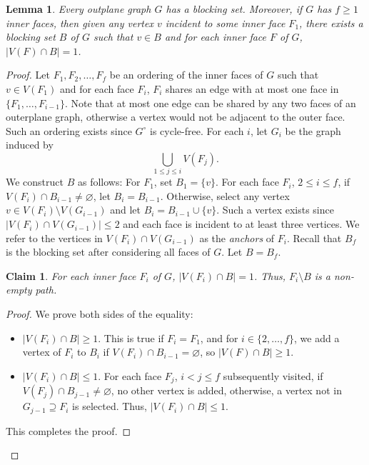 \documentclass{patmorin}
\let\emptyset\varnothing
\newcommand{\wdual}[1]{#1^{\circ}}
\newtheorem{lemma}[theorem]{Lemma}
\newtheorem{claim}{Claim}[theorem]
\begin{document}
\begin{lemma}
 Every outplane graph $G$ has a blocking set. Moreover, if $G$ has
 $f\ge 1$ inner faces, 
 then given any vertex $v$ incident to some inner face $F_1$, there exists a blocking set $B$ of $G$ such that $v \in B$ and for each inner face $F$ of $G$, $|V(F) \cap B|=1$.
 \label{lem:blocking_out}
\end{lemma}
\begin{proof}
 Let $F_1,F_2,\ldots,F_{f}$ be an ordering of the inner faces of $G$ such that $v \in V(F_1)$ and for each face $F_i$, $F_i$ shares an edge with at most one face in $\{F_1,\ldots,F_{i-1}\}$. Note that at most one edge can be shared by any two faces of an outerplane graph, otherwise a vertex would not be adjacent to the outer face. 
 Such an ordering exists since $\wdual{G}$ is cycle-free. For each $i$, let $G_i$ be the graph induced by
 \begin{equation}
  \bigcup_{1 \leq j \leq i}V(F_j).
 \end{equation}
 We construct $B$ as follows: For $F_1$, set $B_1=\{v\}$. For each face $F_i$, $2 \leq i \leq f$, if $V(F_i) \cap B_{i-1} \not= \emptyset$, let $B_i = B_{i-1}$. Otherwise, select any vertex $v \in V(F_i) \setminus V(G_{i-1})$ and let $B_i = B_{i-1} \cup \{v\}$. Such a vertex exists since $|V(F_i) \cap V(G_{i-1})|\leq2$ and each face is incident to at least three vertices. We refer to the vertices in $V(F_i) \cap V(G_{i-1})$ as the \emph{anchors} of $F_i$. Recall that $B_f$ is the blocking set after considering all faces of $G$. Let $B=B_{f}$.
 
 \begin{claim}
  For each inner face $F_i$ of $G$, $|V(F_i) \cap B|=1$. Thus, $F_i \setminus B$ is a non-empty path.
  \label{claim:blocking_out_1}
 \end{claim}
 
 \begin{proof}
  We prove both sides of the equality:
  \begin{itemize}
   \item $|V(F_i) \cap B|\geq1$. This is true if $F_i=F_1$, and for $i \in \{2,\ldots,f\}$, we add a vertex of $F_i$ to $B_i$ if $V(F_i) \cap B_{i-1}=\emptyset$, so $|V(F) \cap B|\geq1$.
   \item $|V(F_i) \cap B|\leq1$. For each face $F_j$, $i < j \leq f$ subsequently visited, if $V(F_j) \cap B_{j-1} \not= \emptyset$, no other vertex is added, otherwise, a vertex not in $G_{j-1}\supseteq F_i$ is selected. Thus, $|V(F_i) \cap B|\leq1$. 
  \end{itemize}
  This completes the proof.
 \end{proof}
 

\end{proof}
\end{document}
